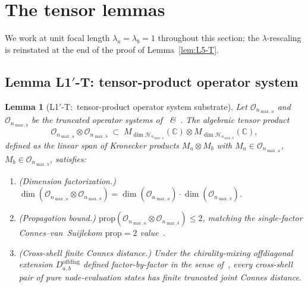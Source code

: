 \documentclass[11pt,a4paper]{article}
\theoremstyle{plain}
\newtheorem{lemma}[theorem]{Lemma}
\theoremstyle{definition}
\newcommand{\nmaxa}{n_{\max,a}}
\newcommand{\nmaxb}{n_{\max,b}}
\newcommand{\Hilb}{\mathcal{H}}
\newcommand{\Op}{\mathcal{O}}
\newcommand{\C}{\mathbb{C}}
\newcommand{\Mat}{M}
\begin{document}
\section{The tensor lemmas}\label{sec:lemmas}

We work at unit focal length $\lambda_a = \lambda_b = 1$ throughout
this section; the $\lambda$-rescaling is reinstated at the end of the
proof of Lemma~\ref{lem:L5-T}.

\subsection{Lemma L1$'$-T: tensor-product operator system}
\label{sec:L1prime-T}

\begin{lemma}[L1$'$-T:\ tensor-product operator system substrate]
\label{lem:L1prime-T}
Let $\Op_{\nmaxa}$ and $\Op_{\nmaxb}$ be the truncated operator systems
of \cite[\S 3.1]{loutey_paper38}~\&~\cite[Lemma~3.1]{loutey_paper38}.
The algebraic tensor product
\begin{equation*}
  \Op_{\nmaxa} \otimes \Op_{\nmaxb}
  \;\subset\; M_{\dim \Hilb_{\nmaxa}}(\C) \otimes M_{\dim \Hilb_{\nmaxb}}(\C),
\end{equation*}
defined as the linear span of Kronecker products $\Mat_a \otimes \Mat_b$
with $\Mat_a \in \Op_{\nmaxa}$, $\Mat_b \in \Op_{\nmaxb}$, satisfies:
\begin{enumerate}\setlength{\itemsep}{2pt}
\item[(a)] (Dimension factorization.)
$\dim(\Op_{\nmaxa} \otimes \Op_{\nmaxb})
= \dim(\Op_{\nmaxa}) \cdot \dim(\Op_{\nmaxb})$.
\item[(b)] (Propagation bound.) $\mathrm{prop}(\Op_{\nmaxa} \otimes
\Op_{\nmaxb}) \le 2$, matching the single-factor Connes--van~Suijlekom
$\mathrm{prop} = 2$ value~\cite[\S 4.2]{connes_vs2021}.
\item[(c)] (Cross-shell finite Connes distance.) Under the
chirality-mixing offdiagonal extension $D_{a,b}^{\mathrm{offdiag}}$
defined factor-by-factor in the sense
of~\cite[Lemma~3.1]{loutey_paper38}, every cross-shell pair of pure
node-evaluation states has finite truncated joint Connes distance.
\end{enumerate}
\end{lemma}
\end{document}
